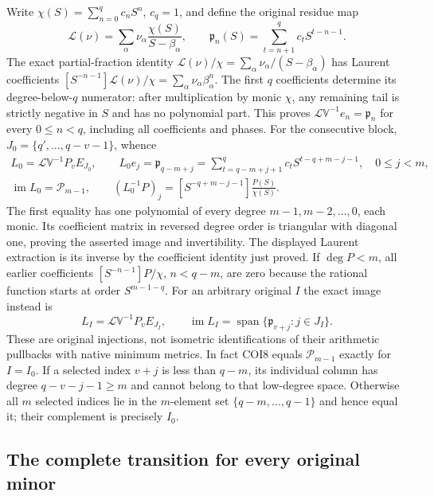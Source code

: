 \documentclass[11pt,a4paper]{article}
\begin{document}
Write $\chi(S)=\sum_{n=0}^{q}c_nS^n$, $c_q=1$, and define the
original residue map
\[
 \mathcal L(\nu)=\sum_\alpha\nu_\alpha\frac{\chi(S)}{S-\beta_\alpha},
 \qquad
 \mathfrak p_n(S)=\sum_{t=n+1}^{q}c_tS^{t-n-1}.
 \tag{COI6}
\]
The exact partial-fraction identity
$\mathcal L(\nu)/\chi=\sum_\alpha\nu_\alpha/(S-\beta_\alpha)$
has Laurent coefficients
$[S^{-n-1}]\mathcal L(\nu)/\chi=\sum_\alpha\nu_\alpha\beta_\alpha^n$.
The first $q$ coefficients determine its degree-below-$q$ numerator:
after multiplication by monic $\chi$, any remaining tail is strictly
negative in $S$ and has no polynomial part. This proves
$\mathcal L\mathbb V^{-1}e_n=\mathfrak p_n$ for every $0\le n<q$,
including all coefficients and phases.
For the consecutive block, $J_0=\{q',\ldots,q-v-1\}$, whence
\[
 \begin{gathered}
 L_0=\mathcal L\mathbb V^{-1}P_vE_{J_0},\qquad
 L_0e_j=\mathfrak p_{q-m+j}
       =\sum_{t=q-m+j+1}^{q}c_tS^{t-q+m-j-1},\quad0\le j<m,\\
 \operatorname{im}L_0=\mathcal P_{m-1},\qquad
 (L_0^{-1}P)_j=[S^{-q+m-j-1}]\frac{P(S)}{\chi(S)}.
 \end{gathered}                                                   \tag{COI7}
\]
The first equality has one polynomial of every degree
$m-1,m-2,\ldots,0$, each monic. Its coefficient matrix in reversed
degree order is triangular with diagonal one, proving the asserted
image and invertibility. The displayed Laurent extraction is its
inverse by the coefficient identity just proved. If $\deg P<m$,
all earlier coefficients $[S^{-n-1}]P/\chi$, $n<q-m$, are zero
because the rational function starts at order $S^{m-1-q}$.
For an arbitrary original $I$ the exact image instead is
\[
 L_I=\mathcal L\mathbb V^{-1}P_vE_{J_I},\qquad
 \operatorname{im}L_I
       =\operatorname{span}\{\mathfrak p_{v+j}:j\in J_I\}.
 \tag{COI8}
\]
These are original injections, not isometric identifications of
their arithmetic pullbacks with native minimum metrics.
In fact COI8 equals $\mathcal P_{m-1}$ exactly for $I=I_0$.
If a selected index $v+j$ is less than $q-m$, its individual
column has degree $q-v-j-1\ge m$ and cannot belong to that
low-degree space. Otherwise all $m$ selected indices lie in
the $m$-element set $\{q-m,\ldots,q-1\}$ and hence equal it;
their complement is precisely $I_0$.

\subsection{The complete transition for every original minor}
\end{document}
